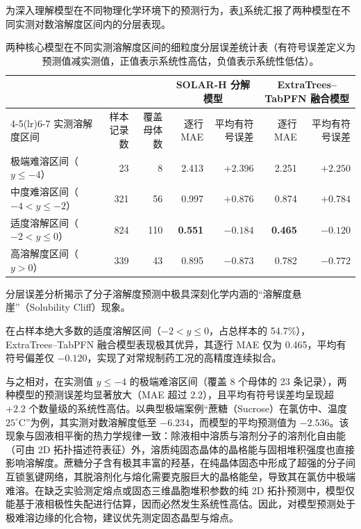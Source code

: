 为深入理解模型在不同物理化学环境下的预测行为，表\ref{tab:v2_target_band_errors}系统汇报了两种模型在不同实测对数溶解度区间内的分层表现。

\begin{table}[htbp]
\centering
\small
\setlength{\tabcolsep}{3.5pt}
\caption{两种核心模型在不同实测溶解度区间的细粒度分层误差统计表（有符号误差定义为预测值减实测值，正值表示系统性高估，负值表示系统性低估）。}
\label{tab:v2_target_band_errors}
\begin{tabular}{lrrrrrr}
\toprule
& & & \multicolumn{2}{c}{SOLAR-H 分解模型} & \multicolumn{2}{c}{ExtraTrees--TabPFN 融合模型}\\
\cmidrule(lr){4-5}\cmidrule(lr){6-7}
实测溶解度区间 & 样本记录数 & 覆盖母体数 & 逐行 MAE & 平均有符号误差 & 逐行 MAE & 平均有符号误差 \\
\midrule
极端难溶区间（$y \leqslant -4$） & 23 & 8 & 2.413 & $+2.396$ & 2.251 & $+2.250$ \\
中度难溶区间（$-4 < y \leqslant -2$） & 321 & 56 & 0.997 & $+0.876$ & 0.874 & $+0.784$ \\
适度溶解区间（$-2 < y \leqslant 0$） & 824 & 110 & \textbf{0.551} & $-0.184$ & \textbf{0.465} & $-0.120$ \\
高溶解度区间（$y > 0$） & 339 & 43 & 0.895 & $-0.873$ & 0.782 & $-0.772$ \\
\bottomrule
\end{tabular}
\end{table}

分层误差分析揭示了分子溶解度预测中极具深刻化学内涵的“溶解度悬崖”（Solubility Cliff）现象。

在占样本绝大多数的适度溶解区间（$-2 < y \leqslant 0$，占总样本的 54.7\%），ExtraTrees--TabPFN 融合模型表现极其优异，其逐行 MAE 仅为 0.465，平均有符号偏差仅 $-0.120$，实现了对常规制药工况的高精度连续拟合。

与之相对，在实测值 $y \leqslant -4$ 的极端难溶区间（覆盖 8 个母体的 23 条记录），两种模型的预测误差均显著放大（MAE 超过 2.2），且平均有符号误差均呈现超 $+2.2$ 个数量级的系统性高估。以典型极端案例“蔗糖（Sucrose）在氯仿中、温度 $25^\circ\text{C}$”为例，其实测对数溶解度低至 $-6.234$，而模型的平均预测值为 $-2.536$。该现象与固液相平衡的热力学规律一致：除液相中溶质与溶剂分子的溶剂化自由能（可由 2D 拓扑描述符表征）外，溶质纯固态晶体的晶格能与固相堆积强度也直接影响溶解度。蔗糖分子含有极其丰富的羟基，在纯晶体固态中形成了超强的分子间互锁氢键网络，其脱溶剂化与熔化需要克服巨大的晶格能垒，导致其在氯仿中极端难溶。在缺乏实验测定熔点或固态三维晶胞堆积参数的纯 2D 拓扑预测中，模型仅能基于液相极性失配进行估算，因而必然发生系统性高估。因此，对模型预测处于极难溶边缘的化合物，建议优先测定固态晶型与熔点。

